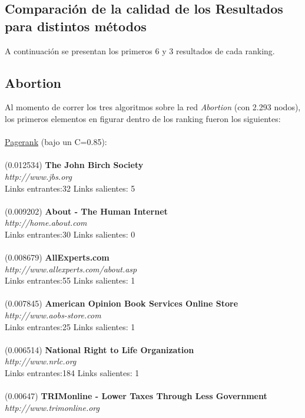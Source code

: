 \documentclass[a4paper]{article}
\begin{document}
\newpage

\subsection{Comparaci\'on de la calidad de los Resultados para distintos m\'etodos}
A continuaci\'on se presentan los primeros 6 y 3 resultados de cada ranking.
\subsection*{Abortion}
\indent Al momento de correr los tres algoritmos sobre la red \emph{Abortion} (con 2.293 nodos), los primeros elementos en figurar dentro de los ranking fueron los siguientes: \\
\\
\underline{Pagerank} (bajo un C=0.85): \\
\\
(0.012534) \textbf{The John Birch Society} \\
\textit{http://www.jbs.org} \\
Links entrantes:32 \indent Links salientes: 5\\
\\
(0.009202) \textbf{About - The Human Internet} \\
\textit{http://home.about.com} \\
Links entrantes:30 \indent Links salientes: 0\\
\\
(0.008679)\textbf{ AllExperts.com }\\
\textit{http://www.allexperts.com/about.asp} \\
Links entrantes:55 \indent Links salientes: 1\\
\\
(0.007845) \textbf{American Opinion Book Services Online Store }\\
\textit{http://www.aobs-store.com} \\
Links entrantes:25 \indent Links salientes: 1\\
\\
(0.006514) \textbf{National Right to Life Organization} \\
\textit{http://www.nrlc.org} \\
Links entrantes:184 \indent Links salientes: 1\\
\\
(0.00647) \textbf{TRIMonline - Lower Taxes Through Less Government} \\
\textit{http://www.trimonline.org} \\
\end{document}

